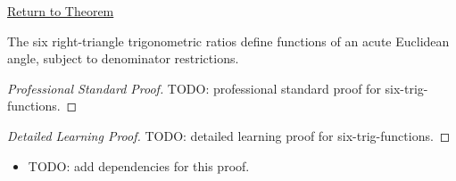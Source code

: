 \newpage
{}
\label{prf:six-trig-functions}

\begin{remark*}[Return]
\hyperref[thm:six-trig-functions]{Return to Theorem}
\end{remark*}

\begin{theorem*}
The six right-triangle trigonometric ratios define functions of an acute
Euclidean angle, subject to denominator restrictions.
\end{theorem*}

\begin{proof}[Professional Standard Proof]
\LRAProofBodyStart
TODO: professional standard proof for six-trig-functions.
\end{proof}

\begin{proof}[Detailed Learning Proof]
\LRAProofBodyStart
TODO: detailed learning proof for six-trig-functions.
\end{proof}

\begin{remark*}
\end{remark*}

\begin{dependencies}
\begin{itemize}
  \item TODO: add dependencies for this proof.
\end{itemize}
\end{dependencies}

\clearpage
